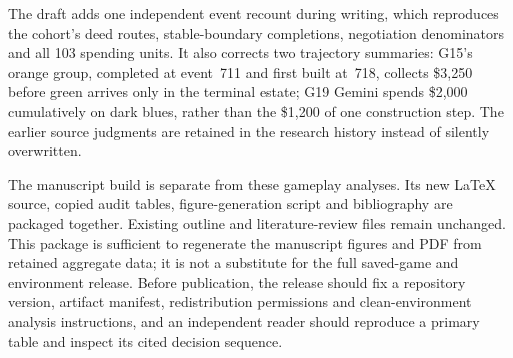 The draft adds one independent event recount during writing, which reproduces the cohort's deed routes, stable-boundary completions, negotiation denominators and all 103 spending units. It also corrects two trajectory summaries: G15's orange group, completed at event~711 and first built at~718, collects \$3,250 before green arrives only in the terminal estate; G19 Gemini spends \$2,000 cumulatively on dark blues, rather than the \$1,200 of one construction step. The earlier source judgments are retained in the research history instead of silently overwritten.

The manuscript build is separate from these gameplay analyses. Its new LaTeX source, copied audit tables, figure-generation script and bibliography are packaged together. Existing outline and literature-review files remain unchanged. This package is sufficient to regenerate the manuscript figures and PDF from retained aggregate data; it is not a substitute for the full saved-game and environment release. Before publication, the release should fix a repository version, artifact manifest, redistribution permissions and clean-environment analysis instructions, and an independent reader should reproduce a primary table and inspect its cited decision sequence.

